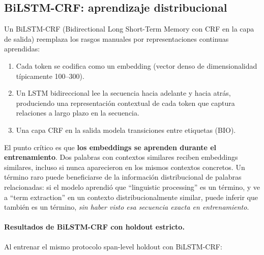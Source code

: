 \subsection{BiLSTM-CRF: aprendizaje distribucional}
\label{subsec:bilstm_crf}

Un BiLSTM-CRF (Bidirectional Long Short-Term Memory con CRF en la capa de salida) reemplaza los rasgos manuales por representaciones continuas aprendidas:

\begin{enumerate}
    \item Cada token se codifica como un embedding (vector denso de dimensionalidad típicamente 100--300).
    \item Un LSTM bidireccional lee la secuencia hacia adelante y hacia atrás, produciendo una representación contextual de cada token que captura relaciones a largo plazo en la secuencia.
    \item Una capa CRF en la salida modela transiciones entre etiquetas (BIO).
\end{enumerate}

El punto crítico es que \textbf{los embeddings se aprenden durante el entrenamiento}. Dos palabras con contextos similares reciben embeddings similares, incluso si nunca aparecieron en los mismos contextos concretos. Un término raro puede beneficiarse de la información distribucional de palabras relacionadas: si el modelo aprendió que ``linguistic processing'' es un término, y ve a ``term extraction'' en un contexto distribucionalmente similar, puede inferir que también es un término, \emph{sin haber visto esa secuencia exacta en entrenamiento}.

\paragraph{Resultados de BiLSTM-CRF con holdout estricto.}
Al entrenar el mismo protocolo span-level holdout con BiLSTM-CRF:


